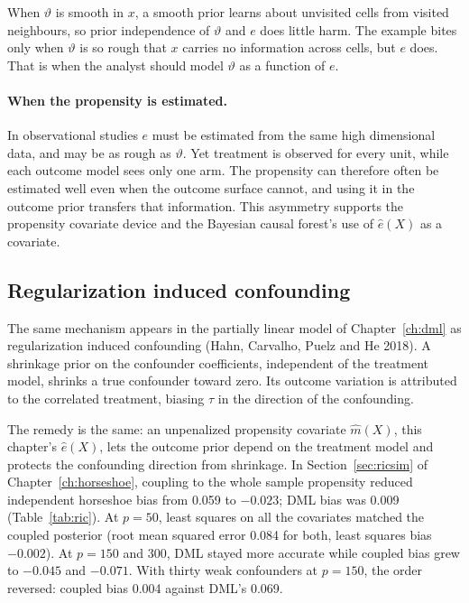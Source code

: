 When $\vartheta$ is smooth in $x$, a smooth prior learns about unvisited cells from visited neighbours, so prior independence of $\vartheta$ and $e$ does little harm. The example bites only when $\vartheta$ is so rough that $x$ carries no information across cells, but $e$ does. That is when the analyst should model $\vartheta$ as a function of $e$.

\paragraph{When the propensity is estimated.}
In observational studies $e$ must be estimated from the same high dimensional data, and may be as rough as $\vartheta$. Yet treatment is observed for every unit, while each outcome model sees only one arm. The propensity can therefore often be estimated well even when the outcome surface cannot, and using it in the outcome prior transfers that information. This asymmetry supports the propensity covariate device and the Bayesian causal forest's use of $\hat e(X)$ as a covariate.

\subsection{Regularization induced confounding}

The same mechanism appears in the partially linear model of Chapter~\ref{ch:dml} as regularization induced confounding (Hahn, Carvalho, Puelz and He 2018). A shrinkage prior on the confounder coefficients, independent of the treatment model, shrinks a true confounder toward zero. Its outcome variation is attributed to the correlated treatment, biasing $\tau$ in the direction of the confounding.

The remedy is the same: an unpenalized propensity covariate $\hat m(X)$, this chapter's $\hat e(X)$, lets the outcome prior depend on the treatment model and protects the confounding direction from shrinkage. In Section~\ref{sec:ricsim} of Chapter~\ref{ch:horseshoe}, coupling to the whole sample propensity reduced independent horseshoe bias from 0.059 to $-0.023$; DML bias was 0.009 (Table~\ref{tab:ric}). At $p = 50$, least squares on all the covariates matched the coupled posterior (root mean squared error 0.084 for both, least squares bias $-0.002$). At $p = 150$ and 300, DML stayed more accurate while coupled bias grew to $-0.045$ and $-0.071$. With thirty weak confounders at $p = 150$, the order reversed: coupled bias 0.004 against DML's 0.069.

